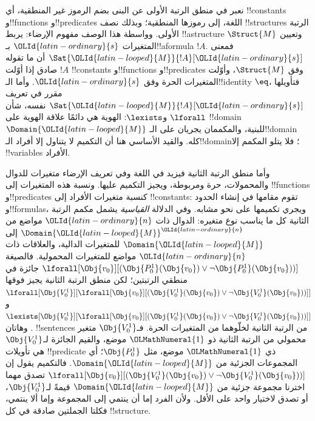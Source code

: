 \documentclass[../../../include/open-logic-section]{subfiles}
\begin{document}


نعبر في منطق الرتبة الأولى عن البنى بضم الرموز غير المنطقية،
أي !!{constant}s و!!{function}s و!!{predicate}s اللغة، إلى
رموزها المنطقية؛ وبذلك نصف !!{structure}s الرتبة الأولى.
وواسطة هذا الوصف مفهوم الإرضاء: يربط !!a{structure}
$\Struct{M}$ وتعيين المتغيرات ${\OLId{latin-ordinary}{s}}$ بـ!!a{formula} $!A$.
فمعنى $\Sat{{\OLId{latin-looped}{M}}}{!A}[{\OLId{latin-ordinary}{s}}]$ أن ما تقوله $!A$ صادق إذا أوّلت
!!{constant}s و!!{function}s و!!{predicate}s وفق $\Struct{M}$،
وأوّلت المتغيرات الحرة وفق ${\OLId{latin-ordinary}{s}}$. وأما الـ!!{identity} $\eq$،
فتأويلها مقرر في تعريف $\Sat{{\OLId{latin-looped}{M}}}{!A}[{\OLId{latin-ordinary}{s}}]$ نفسه، شأن
$\lforall$ و$\lexists$: الهوية هي دائمًا علاقة الهوية على
!!{domain} $\Domain{{\OLId{latin-looped}{M}}}$ للبنية، والمكممان يجريان على
الـ!!{domain} كله. والقيد الأساسي هنا أن التكميم لا يتناول إلا
أفراد الـ!!{domain}؛ فلا يتلو المكمم إلا !!{variable}s الأفراد.

وأما منطق الرتبة الثانية فيزيد في اللغة وفي تعريف الإرضاء
متغيرات للدوال والمحمولات، حرة ومربوطة، ويجيز التكميم عليها.
ونسبة هذه المتغيرات إلى !!{function}s و!!{predicate}s كنسبة
متغيرات الأفراد إلى !!{constant}s: تقوم مقامها في إنشاء الحدود
و!!{formula}s، ويجري تكميمها على نحو مشابه.
وفي الدلالة \emph{القياسية} يشمل مكمم الرتبة الثانية كل ما
يناسب نوع متغيره: الدوال ذات ${\OLId{latin-ordinary}{n}}$ مواضع من $\Domain{{\OLId{latin-looped}{M}}}^{\OLId{latin-ordinary}{n}}$
إلى $\Domain{{\OLId{latin-looped}{M}}}$ للمتغيرات الدالية، والعلاقات ذات ${\OLId{latin-ordinary}{n}}$ مواضع
للمتغيرات المحمولية. فالصيغة
$\lforall[\Obj{v_0}][(\Obj{P^1_0}(\Obj{v_0}) \lor \lnot
  \Obj{P^1_0}(\Obj{v_0}))]$ جائزة في منطقي الرتبتين؛
لكن منطق الرتبة الثانية يجيز فوقها
$\lforall[\Obj{V^1_0}][\lforall[\Obj{v_0}][(\Obj{V^1_0}(\Obj{v_0}) \lor
    \lnot \Obj{V^1_0}(\Obj{v_0}))]]$ و
$\lexists[\Obj{V^1_0}][\lforall[\Obj{v_0}][(\Obj{V^1_0}(\Obj{v_0}) \lor
    \lnot \Obj{V^1_0}(\Obj{v_0}))]]$.
وهاتان !!{sentence}s من الرتبة الثانية لخلّوهما من المتغيرات
الحرة. فـ$\Obj{V^1_0}$ متغير محمولي من الرتبة الثانية ذو ${\OLMathNumeral{1}}$
موضع، والقيم الجائزة لـ$\Obj{V^1_0}$ هي تأويلات
!!{predicate} ذي ${\OLMathNumeral{1}}$ موضع، مثل $\Obj{P^1_0}$؛ أي المجموعات
الجزئية من $\Domain{{\OLId{latin-looped}{M}}}$. فالتكميم يقول إن
$\lforall[\Obj{v_0}][(\Obj{V^1_0}(\Obj{v_0}) \lor \lnot
  \Obj{V^1_0}(\Obj{v_0}))]$ تصدق مهما اخترنا مجموعة جزئية من
$\Domain{{\OLId{latin-looped}{M}}}$ قيمةً لـ$\Obj{V^1_0}$، أو تصدق لاختيار واحد
على الأقل. ولأن الفرد إما أن ينتمي إلى المجموعة وإما ألا ينتمي،
فكلتا الجملتين صادقة في كل !!{structure}.
\end{document}
